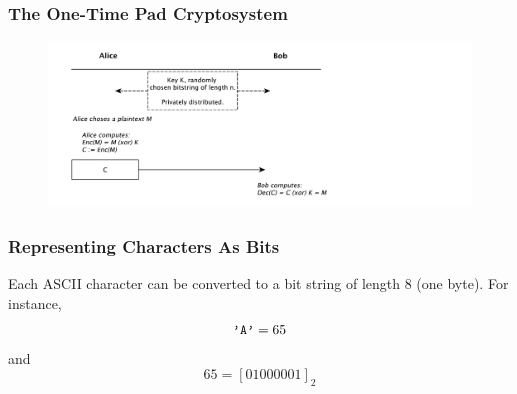 \documentclass{beamer}
\newcommand{\<}{\langle}
\renewcommand{\>}{\rangle}
\begin{document}
\begin{frame}
\frametitle{The One-Time Pad Cryptosystem}

\begin{figure}
\includegraphics[scale=.55]{IMG/otp}
\end{figure}
\end{frame}


\begin{frame}[fragile]
\frametitle{Representing Characters As Bits}

Each ASCII character can be converted to a bit string of length 8 (one byte). For instance,
\[
\verb|'A'| = 65
\]
and
\[
65 = [01000001]_2
\]
\end{frame}
\end{document}
